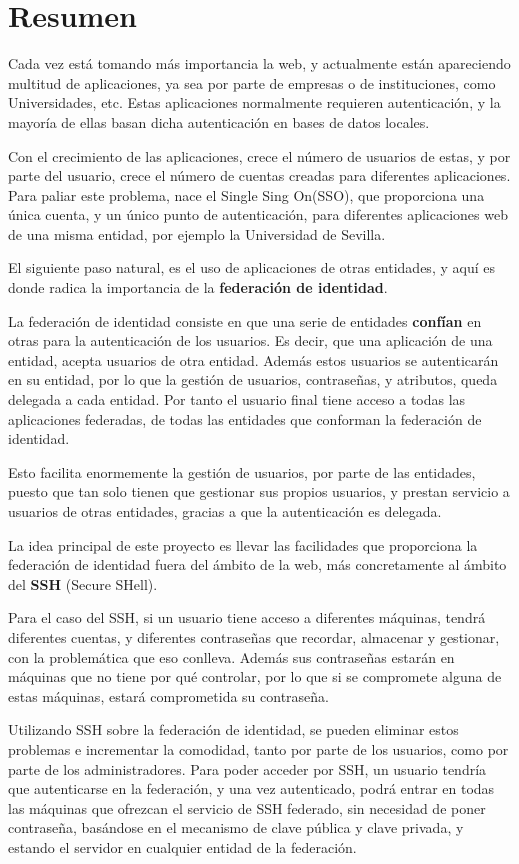 \section{Resumen}
Cada vez está tomando más importancia la web, y actualmente están
apareciendo multitud de aplicaciones, ya sea por parte de empresas o
de instituciones, como Universidades, etc. Estas aplicaciones
normalmente requieren autenticación, y la mayoría de ellas basan dicha
autenticación en bases de datos locales.

Con el crecimiento de las aplicaciones, crece el número de usuarios de
estas, y por parte del usuario, crece el número de cuentas creadas
para diferentes aplicaciones. Para paliar este problema, nace el
Single Sing On(SSO), que proporciona una única cuenta, y un único
punto de autenticación, para diferentes aplicaciones web de una misma
entidad, por ejemplo la Universidad de Sevilla.

El siguiente paso natural, es el uso de aplicaciones de otras
entidades, y aquí es donde radica la importancia de la
\textbf{federación de identidad}.

La federación de identidad consiste en que una serie de entidades
\textbf{confían} en otras para la autenticación de los usuarios. Es
decir, que una aplicación de una entidad, acepta usuarios de otra
entidad. Además estos usuarios se autenticarán en su entidad, por lo
que la gestión de usuarios, contraseñas, y atributos, queda delegada a
cada entidad. Por tanto el usuario final tiene acceso a todas las
aplicaciones federadas, de todas las entidades que conforman la
federación de identidad.

Esto facilita enormemente la gestión de usuarios, por parte de las
entidades, puesto que tan solo tienen que gestionar sus propios
usuarios, y prestan servicio a usuarios de otras entidades, gracias a
que la autenticación es delegada.

La idea principal de este proyecto es llevar las facilidades que
proporciona la federación de identidad fuera del ámbito de la web,
más concretamente al ámbito del \textbf{SSH} (Secure SHell).

Para el caso del SSH, si un usuario tiene acceso a diferentes
máquinas, tendrá diferentes cuentas, y diferentes contraseñas que
recordar, almacenar y gestionar, con la problemática que eso conlleva.
Además sus contraseñas estarán en máquinas que no tiene por qué
controlar, por lo que si se compromete alguna de estas máquinas,
estará comprometida su contraseña.

Utilizando SSH sobre la federación de identidad, se pueden eliminar
estos problemas e incrementar la comodidad, tanto por parte de los
usuarios, como por parte de los administradores. Para poder acceder
por SSH, un usuario tendría que autenticarse en la federación, y una
vez autenticado, podrá entrar en todas las máquinas que ofrezcan el
servicio de SSH federado, sin necesidad de poner contraseña, basándose
en el mecanismo de clave pública y clave privada, y estando el
servidor en cualquier entidad de la federación.

